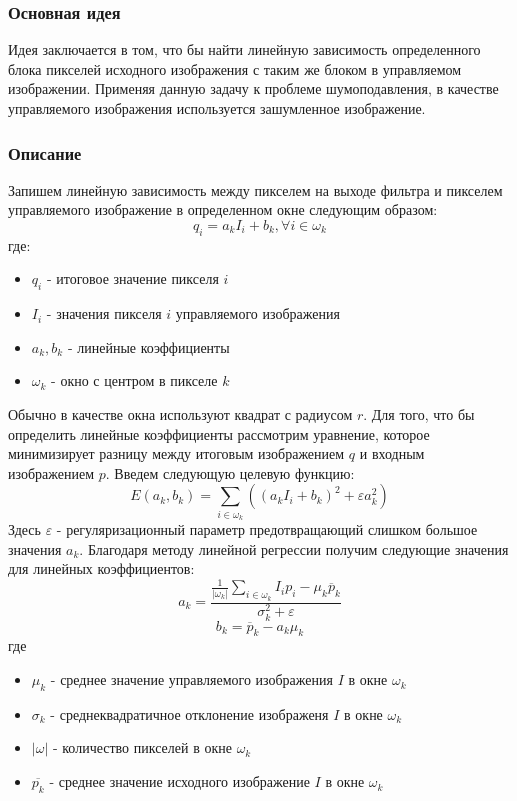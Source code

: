 \subsubsection{Основная идея}
Идея заключается в том, что бы найти линейную зависимость определенного блока пикселей исходного изображения с таким же блоком в управляемом изображении. Применяя данную задачу к проблеме шумоподавления, в качестве управляемого изображения используется зашумленное изображение.
\subsubsection{Описание}
Запишем линейную зависимость между пикселем на выходе фильтра и пикселем управляемого изображение в определенном окне следующим образом:
\begin{equation}\label{eq:Guided}
	q_i=a_kI_i+b_k, \forall i \in \omega_k
\end{equation} 
где: 
\begin{itemize}
	\item $q_i$ - итоговое значение пикселя $i$
	\item $I_i$ - значения пикселя $i$ управляемого изображения
	\item $a_k, b_k$ - линейные коэффициенты
	\item $\omega_k$ - окно с центром в пикселе $k$
\end{itemize}
Обычно в качестве окна используют квадрат с радиусом $r$.
Для того, что бы определить линейные коэффициенты рассмотрим уравнение, которое минимизирует разницу между итоговым изображением $q$ и входным изображением $p$. Введем следующую целевую функцию\cite{He}:
\begin{equation}
	E(a_k,b_k) = \sum_{i\in \omega_k}((a_kI_i+b_k)^2+\varepsilon a_k^2)
\end{equation}
Здесь $\varepsilon$ - регуляризационный параметр предотвращающий слишком большое значения $a_k$. Благодаря методу линейной регрессии получим следующие значения для линейных коэффициентов:
\begin{equation}
	a_k=\frac{\frac{1}{|\omega_k|}\sum_{i \in \omega_k}I_ip_i-\mu_k\overline{p}_k}{\sigma_k^2 + \varepsilon}
\end{equation}
\begin{equation}
b_k=\overline{p}_k-a_k\mu_k
\end{equation}
где
\begin{itemize}
	\item $\mu_k$ - среднее значение управляемого изображения $I$ в окне $\omega_k$
	\item $\sigma_k$ - среднеквадратичное отклонение изображеня $I$ в окне $\omega_k$
	\item $|\omega|$ - количество пикселей в окне $\omega_k$ 
	\item $\overline{p_k}$ - среднее значение исходного изображение $I$ в окне $\omega_k$
\end{itemize}
